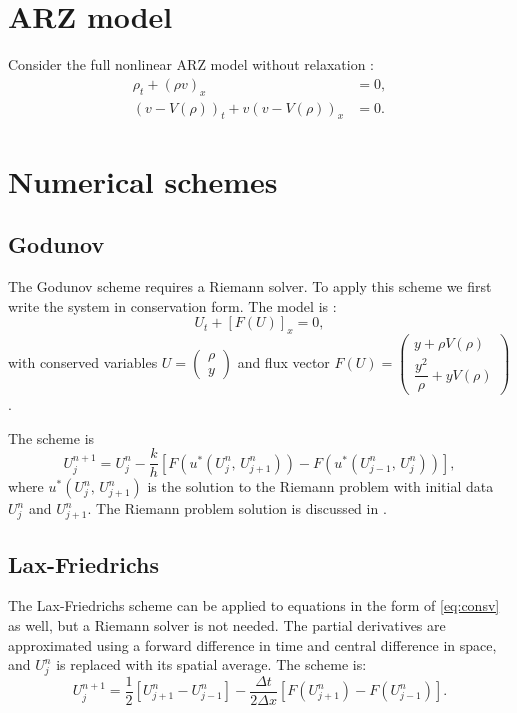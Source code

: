 \documentclass[letterpaper]{article}
\newcommand{\Dt}{\Delta t}
\newcommand{\Dx}{\Delta x}
\begin{document}
\section{ARZ model}

Consider the full nonlinear ARZ model without relaxation \cite{AR, Z}:
\begin{align} 
\rho_t + (\rho v)_x &= 0, \label{ARZ1} \\
(v - V(\rho))_t + v(v - V(\rho))_x &=0. \label{ARZ2}
\end{align}

\section{Numerical schemes}

\subsection{Godunov}

The Godunov scheme requires a Riemann solver. To apply this scheme we first write the system in conservation form. The model is \cite{GodunovARZ}:
\begin{equation} \label{eq:consv}
U_t + [F(U)]_x = 0,
\end{equation}
with conserved variables $U = \begin{pmatrix} \rho \\ y \end{pmatrix}$ and flux vector $F(U) = \begin{pmatrix} y + \rho V(\rho) \\ \dfrac{y^2}{\rho} + y V(\rho) \end{pmatrix}$.

The scheme is 
\begin{equation}
U^{n+1}_j = U^n_j - \dfrac{k}{h}\left[F(u^*(U^n_j, \, U^n_{j+1})) - F(u^*(U^n_{j-1}, \, U^n_j))\right],
\end{equation}
where $u^*(U^n_j, \, U^n_{j+1})$ is the solution to the Riemann problem with initial data $U^n_j$ and $U^n_{j+1}$. The Riemann problem solution is discussed in \cite{GodunovARZ}.

\subsection{Lax-Friedrichs}
The Lax-Friedrichs scheme can be applied to equations in the form of \eqref{eq:consv} as well, but a Riemann solver is not needed. The partial derivatives are approximated using a forward difference in time and central difference in space, and $U^n_j$ is replaced with its spatial average. The scheme is:
\begin{equation}
U^{n+1}_j = \frac{1}{2}[U^n_{j+1} - U^n_{j-1}] - \dfrac{\Dt}{2 \Dx}[F(U^n_{j+1}) - F(U^n_{j-1})].
\end{equation}
\end{document}

